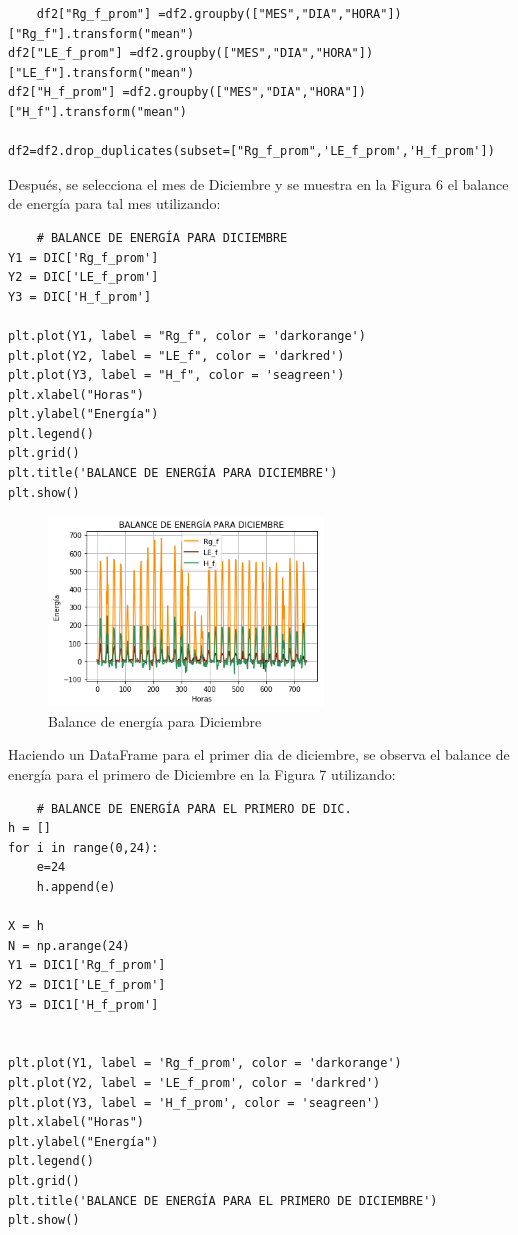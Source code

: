 \documentclass[11pt, spanish]{report}
\begin{document}
\begin{verbatim}
    df2["Rg_f_prom"] =df2.groupby(["MES","DIA","HORA"])["Rg_f"].transform("mean")
df2["LE_f_prom"] =df2.groupby(["MES","DIA","HORA"])["LE_f"].transform("mean")
df2["H_f_prom"] =df2.groupby(["MES","DIA","HORA"])["H_f"].transform("mean")

df2=df2.drop_duplicates(subset=["Rg_f_prom",'LE_f_prom','H_f_prom'])
\end{verbatim}
Después, se selecciona el mes de Diciembre y se muestra en la Figura 6 el balance de energía para tal mes utilizando:
\begin{verbatim}
    # BALANCE DE ENERGÍA PARA DICIEMBRE
Y1 = DIC['Rg_f_prom']          
Y2 = DIC['LE_f_prom']          
Y3 = DIC['H_f_prom']        

plt.plot(Y1, label = "Rg_f", color = 'darkorange')   
plt.plot(Y2, label = "LE_f", color = 'darkred')   
plt.plot(Y3, label = "H_f", color = 'seagreen')   
plt.xlabel("Horas")   
plt.ylabel("Energía")  
plt.legend()
plt.grid()
plt.title('BALANCE DE ENERGÍA PARA DICIEMBRE')
plt.show()
\end{verbatim}
\begin{figure}[ht]
\caption{Balance de energía para Diciembre}
\centering
\includegraphics[width=0.65\textwidth]{figura6.png}
\end{figure}
Haciendo un DataFrame para el primer dia de diciembre, se observa el balance de energía para el primero de Diciembre en la Figura 7 utilizando:
\begin{verbatim}
    # BALANCE DE ENERGÍA PARA EL PRIMERO DE DIC.
h = []
for i in range(0,24):
    e=24
    h.append(e)

X = h                 
N = np.arange(24)         
Y1 = DIC1['Rg_f_prom']     
Y2 = DIC1['LE_f_prom']     
Y3 = DIC1['H_f_prom']      


plt.plot(Y1, label = 'Rg_f_prom', color = 'darkorange')   
plt.plot(Y2, label = 'LE_f_prom', color = 'darkred')   
plt.plot(Y3, label = 'H_f_prom', color = 'seagreen')   
plt.xlabel("Horas")   
plt.ylabel("Energía")  
plt.legend()
plt.grid()
plt.title('BALANCE DE ENERGÍA PARA EL PRIMERO DE DICIEMBRE')
plt.show()
\end{verbatim}
\end{document}
